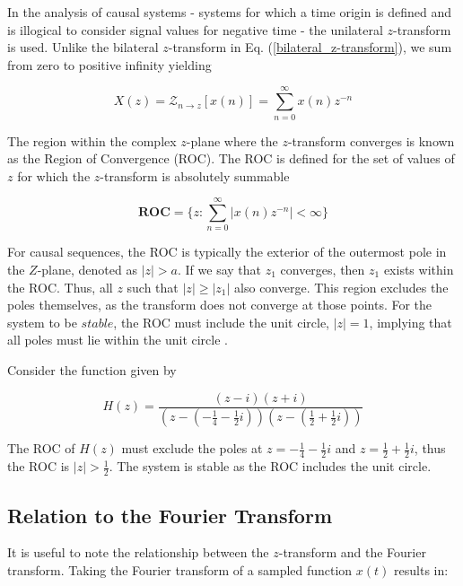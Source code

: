 \documentclass[a4paper]{report}
\begin{document}
In the analysis of causal systems - systems for which a time origin is defined and is illogical to consider signal values for negative time - the unilateral $z$-transform is used. Unlike the bilateral $z$-transform in Eq. (\ref{bilateral_z-transform}), we sum from zero to positive infinity yielding

\begin{equation}\label{unilateral_z-transform}
X(z) = \mathcal{Z}_{n \rightarrow z}[x(n)] = \sum^{\infty}_{n = 0} x(n)z^{-n}
\end{equation}

The region within the complex $z$-plane where the $z$-transform converges is known as the Region of Convergence (ROC). The ROC is defined for the set of values of $z$ for which the $z$-transform is absolutely summable

\begin{equation}\label{roc}
\textbf{ROC} = \Biggl\{ z : \sum^{\infty}_{n = 0} |x(n)z^{-n}| < \infty \Biggr\}
\end{equation}

For causal sequences, the ROC is typically the exterior of the outermost pole in the $Z$-plane, denoted as $|z| > a$. If we say that $z_1$ converges, then $z_1$ exists within the ROC. Thus, all $z$ such that $|z| \geq |z_1|$ also converge. This region excludes the poles themselves, as the transform does not converge at those points. For the system to be $stable$, the ROC must include the unit circle, $|z| = 1$, implying that all poles must lie within the unit circle \citep{loveless2021guido}.

\begin{example}\label{example:roc_poles}
    Consider the function given by
    
    \begin{equation}
        H(z) = \frac{(z - i)(z + i)}{\left(z - \left(-\frac{1}{4} - \frac{1}{2}i\right)\right)\left(z - \left(\frac{1}{2} + \frac{1}{2}i\right)\right)}
    \end{equation}
    
    The ROC of $H(z)$ must exclude the poles at $z = -\frac{1}{4} - \frac{1}{2}i$ and $z = \frac{1}{2} + \frac{1}{2}i$, thus the ROC is $|z| > \frac{1}{2}$. The system is stable as the ROC includes the unit circle.

\end{example}

\subsection{Relation to the Fourier Transform}\label{rs_fourier_transform}
It is useful to note the relationship between the $z$-transform and the Fourier transform. Taking the Fourier transform of a sampled function $x(t)$ results in:
\end{document}
